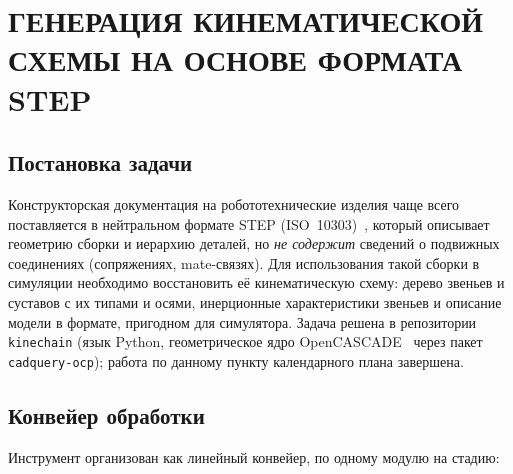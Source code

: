 \chapter{ГЕНЕРАЦИЯ КИНЕМАТИЧЕСКОЙ СХЕМЫ НА ОСНОВЕ ФОРМАТА STEP}
\label{cha:step}

\section{Постановка задачи}

Конструкторская документация на робототехнические изделия чаще всего
поставляется в нейтральном формате STEP (ISO~10303)~\cite{iso10303}, который
описывает геометрию сборки и иерархию деталей, но \emph{не содержит} сведений о
подвижных соединениях (сопряжениях, mate-связях). Для использования такой
сборки в симуляции необходимо восстановить её кинематическую схему: дерево
звеньев и суставов с их типами и осями, инерционные характеристики звеньев и
описание модели в формате, пригодном для симулятора. Задача решена в
репозитории \texttt{kinechain} (язык Python, геометрическое ядро
OpenCASCADE~\cite{opencascade} через пакет \texttt{cadquery-ocp}); работа по
данному пункту календарного плана завершена.

\section{Конвейер обработки}

Инструмент организован как линейный конвейер, по одному модулю на стадию:

